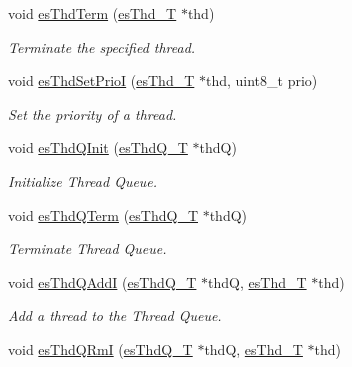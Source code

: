 \begin{DoxyCompactItemize}
void \hyperlink{group__kern__impl_gac9d1eac76f26096614e8196bcfd8b905}{es\-Thd\-Term} (\hyperlink{group__kern__thd_ga62e3a3ca0a4597a19c43cb8868810d82}{es\-Thd\-\_\-\-T} $\ast$thd)
\begin{DoxyCompactList}\small\item\em Terminate the specified thread. \end{DoxyCompactList}\item 
void \hyperlink{group__kern__impl_ga8eaa731d0026a8a1667d4422d5031df6}{es\-Thd\-Set\-Prio\-I} (\hyperlink{group__kern__thd_ga62e3a3ca0a4597a19c43cb8868810d82}{es\-Thd\-\_\-\-T} $\ast$thd, uint8\-\_\-t prio)
\begin{DoxyCompactList}\small\item\em Set the priority of a thread. \end{DoxyCompactList}\item 
void \hyperlink{group__kern__impl_gaddd5fe0557c91559b9452beb0fc236fd}{es\-Thd\-Q\-Init} (\hyperlink{group__kern__thdq_ga7a1a060699e83a01512ebb5540019556}{es\-Thd\-Q\-\_\-\-T} $\ast$thd\-Q)
\begin{DoxyCompactList}\small\item\em Initialize Thread Queue. \end{DoxyCompactList}\item 
void \hyperlink{group__kern__impl_gaa5f19b32a7f0c42616b5270dcbd73a3e}{es\-Thd\-Q\-Term} (\hyperlink{group__kern__thdq_ga7a1a060699e83a01512ebb5540019556}{es\-Thd\-Q\-\_\-\-T} $\ast$thd\-Q)
\begin{DoxyCompactList}\small\item\em Terminate Thread Queue. \end{DoxyCompactList}\item 
void \hyperlink{group__kern__impl_ga9da1e71c137d8adb8c9bdead7052b5fa}{es\-Thd\-Q\-Add\-I} (\hyperlink{group__kern__thdq_ga7a1a060699e83a01512ebb5540019556}{es\-Thd\-Q\-\_\-\-T} $\ast$thd\-Q, \hyperlink{group__kern__thd_ga62e3a3ca0a4597a19c43cb8868810d82}{es\-Thd\-\_\-\-T} $\ast$thd)
\begin{DoxyCompactList}\small\item\em Add a thread to the Thread Queue. \end{DoxyCompactList}\item 
void \hyperlink{group__kern__impl_gaa18afa95e34035da03c5cb7ea3a96320}{es\-Thd\-Q\-Rm\-I} (\hyperlink{group__kern__thdq_ga7a1a060699e83a01512ebb5540019556}{es\-Thd\-Q\-\_\-\-T} $\ast$thd\-Q, \hyperlink{group__kern__thd_ga62e3a3ca0a4597a19c43cb8868810d82}{es\-Thd\-\_\-\-T} $\ast$thd)

\end{DoxyCompactItemize}
